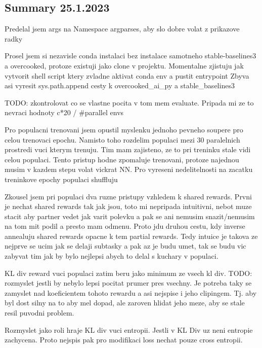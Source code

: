 \documentclass{report}
\begin{document}
\subsection{Summary 25.1.2023}
\begin{list}{}{}
    \item Predelal jsem args na Namespace argparses, aby slo dobre volat z prikazove radky
    \item Prosel jsem si nezavisle conda instalaci bez instalace samotneho stable-baselines3 a overcooked, protoze existuji jako clone v projektu. Momentalne zjistuju jak vytvorit shell script ktery zvladne aktivat conda env a pustit entrypoint
            Zbyva asi vyresit sys.path.append cesty k overcooked\_ai\_py a stable\_baselines3
    \item TODO: zkontrolovat co se vlastne pocita v tom mem evaluate. Pripada mi ze to nevraci hodnoty c*20 / \#parallel envs
    \item Pro populacni trenovani jsem opustil myslenku jednoho pevneho soupere pro celou trenovaci epochu. Namisto toho rozdelim populaci mezi 30 paralelnich prostredi vuci kterym trenuju. 
        Tim mam zajisteno, ze to pri treninku stale vidi celou populaci. Tento pristup hodne zpomaluje trenovani, protoze najednou musim v kazdem stepu volat vickrat NN.
        Pro vyreseni nedelitelnosti na zacatku treninkove epochy populaci shuffluju
    \item Zkousel jsem pri populaci dva ruzne pristupy vzhledem k shared rewards. Prvni je nechat shared rewards tak jak jsou, toto mi nepripada intuitivni, nebot muze stacit aby partner vedet jak varit polevku a pak se ani nemusim snazit/nemusim na tom mit podil a presto mam odmenu.
        Proto jdu druhou cestu, kdy inverse annealuju shared rewards opacne k tem partial rewards. Tedy intuice je takova ze nejprve se ucim jak se delaji subtasky a pak az je budu umet, tak se budu vic zabyvat tim jak by bylo nejlepsi abych to delal s kuchary v populaci.

    \item KL div reward vuci populaci zatim beru jako minimum ze vsech kl div. TODO: rozmyslet jestli by nebylo lepsi pocitat prumer pres vsechny.
        Je potreba taky se zamyslet nad koeficientem tohoto rewardu a asi nejspise i jeho clipingem. Tj. aby byl dost silny na to aby mel dopad, ale zaroven hlidat jeho meze, aby se stale resil puvodni problem.

    \item Rozmyslet jako roli hraje KL div vuci entropii. Jestli v KL Div uz neni entropie zachycena. Proto nejspis pak pro modifikaci loss nechat pouze cross entropii.


\end{list}
\end{document}
